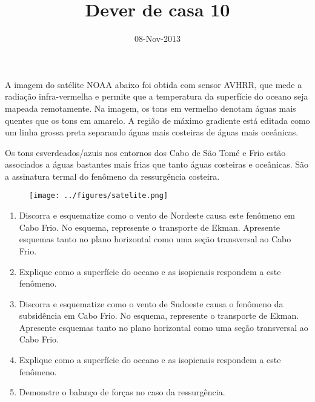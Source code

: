 \documentclass[12pt,portuguese,a4paper,pdftex]{article}
\title{Dever de casa 10}
\date{08-Nov-2013} %
\begin{document}
\maketitle
\doublespacing

A imagem do satélite NOAA abaixo foi obtida com sensor AVHRR, que mede
a radiação infra-vermelha e permite que a temperatura da superfície do oceano
seja mapeada remotamente.  Na imagem, os tons em vermelho denotam águas mais
quentes que os tons em amarelo.  A região de máximo gradiente está editada como
um linha grossa preta separando águas mais costeiras de águas mais oceânicas.

Os tons esverdeados/azuis nos entornos dos Cabo de São Tomé e Frio estão
associados a águas bastantes mais frias que tanto águas costeiras e oceânicas.
São a assinatura termal do fenômeno da ressurgência costeira.

\begin{figure}[H]
\vspace{1cm}
  \centerline{\texttt{[image: ../figures/satelite.png]}}
\end{figure}

\begin{enumerate}
  \item Discorra e esquematize como o vento de Nordeste causa este fenômeno em
        Cabo Frio.  No esquema, represente o transporte de Ekman.  Apresente
        esquemas tanto no plano horizontal como uma seção transversal ao Cabo Frio.

  \item Explique como a superfície do oceano e as isopicnais respondem a este
        fenômeno.

  \item Discorra e esquematize como o vento de Sudoeste causa o fenômeno da
        subsidência em Cabo Frio.  No esquema, represente o transporte de
        Ekman.  Apresente esquemas tanto no plano horizontal como uma seção transversal ao Cabo Frio.

  \item Explique como a superfície do oceano e as isopicnais respondem a este
        fenômeno.

  \item Demonstre o balanço de forças no caso da ressurgência.
\end{enumerate}

\clearpage
\end{document}
